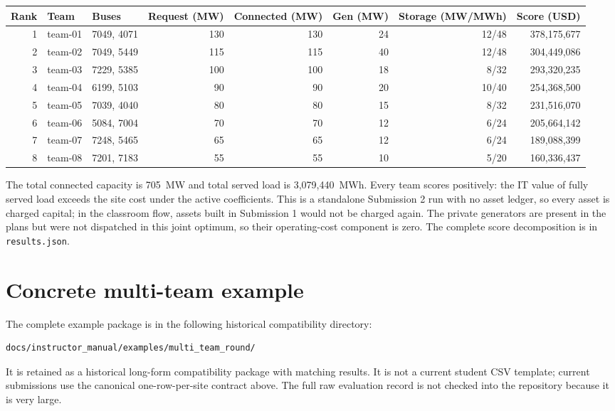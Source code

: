 \documentclass[12pt]{article}
\newcommand{\code}[1]{\texttt{#1}}
\begin{document}
\begin{center}
\small
\begin{tabularx}{\textwidth}{r l l r r r r r}
\toprule
Rank & Team & Buses & Request (MW) & Connected (MW) & Gen (MW) & Storage (MW/MWh) & Score (USD)\\
\midrule
1 & team-01 & 7049, 4071 & 130 & 130 & 24 & 12/48 & 378,175,677\\
2 & team-02 & 7049, 5449 & 115 & 115 & 40 & 12/48 & 304,449,086\\
3 & team-03 & 7229, 5385 & 100 & 100 & 18 & 8/32 & 293,320,235\\
4 & team-04 & 6199, 5103 & 90 & 90 & 20 & 10/40 & 254,368,500\\
5 & team-05 & 7039, 4040 & 80 & 80 & 15 & 8/32 & 231,516,070\\
6 & team-06 & 5084, 7004 & 70 & 70 & 12 & 6/24 & 205,664,142\\
7 & team-07 & 7248, 5465 & 65 & 65 & 12 & 6/24 & 189,088,399\\
8 & team-08 & 7201, 7183 & 55 & 55 & 10 & 5/20 & 160,336,437\\
\bottomrule
\end{tabularx}
\end{center}

The total connected capacity is 705~MW and total served load is
3,079,440~MWh. Every team scores positively: the IT value of fully served
load exceeds the site cost under the active coefficients. This is a standalone
Submission 2 run with no asset ledger, so every asset is charged capital; in the
classroom flow, assets built in Submission 1 would not be charged again. The
private generators are present in the plans but were not dispatched in this
joint optimum, so their operating-cost component is zero.
The complete score decomposition is in \code{results.json}.

\section{Concrete multi-team example}

The complete example package is in the following historical compatibility
directory:
\begin{lstlisting}
docs/instructor_manual/examples/multi_team_round/
\end{lstlisting}
It is retained as
a historical long-form compatibility package with matching results. It is not
a current student CSV template; current submissions use the canonical
one-row-per-site contract above. The full raw evaluation record is not checked
into the repository because it is very large.
\end{document}
